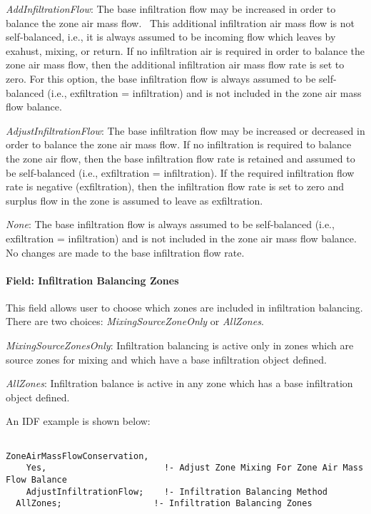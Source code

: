 \emph{AddInfiltrationFlow}: The base infiltration flow may be increased in order to balance the zone air mass flow.~ This additional infiltration air mass flow is not self-balanced, i.e., it is always assumed to be incoming flow which leaves by exahust, mixing, or return. If no infiltration air is required in order to balance the zone air mass flow, then the additional infiltration air mass flow rate is set to zero. For this option, the base infiltration flow is always assumed to be self-balanced (i.e., exfiltration = infiltration) and is not included in the zone air mass flow balance.

\emph{AdjustInfiltrationFlow}: The base infiltration flow may be increased or decreased in order to balance the zone air mass flow. If no infiltration is required to balance the zone air flow, then the base infiltration flow rate is retained and assumed to be self-balanced (i.e., exfiltration = infiltration). If the required infiltration flow rate is negative (exfiltration), then the infiltration flow rate is set to zero and surplus flow in the zone is assumed to leave as exfiltration.

\emph{None}: The base infiltration flow is always assumed to be self-balanced (i.e., exfiltration = infiltration) and is not included in the zone air mass flow balance. No changes are made to the base infiltration flow rate.

\paragraph{Field: Infiltration Balancing Zones}\label{field-infiltration-balancing-zones}

This field allows user to choose which zones are included in infiltration balancing. There are two choices: \emph{MixingSourceZoneOnly} or \emph{AllZones}.

\emph{MixingSourceZonesOnly}: Infiltration balancing is active only in zones which are source zones for mixing and which have a base infiltration object defined.

\emph{AllZones}: Infiltration balance is active in any zone which has a base infiltration object defined.

An IDF example is shown below:

\begin{lstlisting}

ZoneAirMassFlowConservation,
    Yes,                       !- Adjust Zone Mixing For Zone Air Mass Flow Balance
    AdjustInfiltrationFlow;    !- Infiltration Balancing Method
  AllZones;                  !- Infiltration Balancing Zones
\end{lstlisting}

